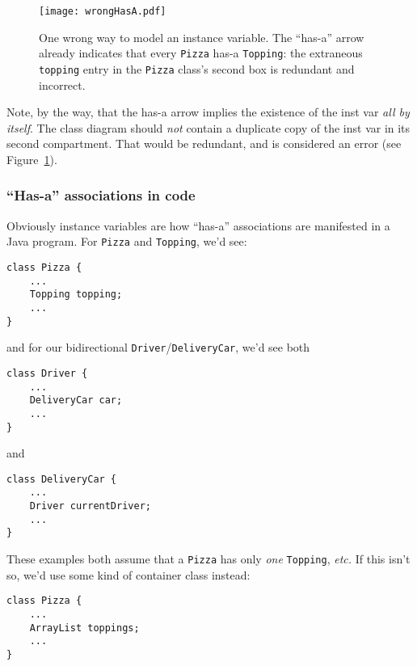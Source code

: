 \begin{figure}[ht]
\centering
\texttt{[image: wrongHasA.pdf]}   %
\caption{One wrong way to model an instance variable. The ``has-a'' arrow
already indicates that every \texttt{Pizza} has-a \texttt{Topping}: the
extraneous \texttt{topping} entry in the \texttt{Pizza} class's second box is
redundant and incorrect.}
\label{fig:wrongHasA}
\end{figure}

Note, by the way, that the has-a arrow implies the existence of the inst var
\textit{all by itself}. The class diagram should \textit{not} contain a
duplicate copy of the inst var in its second compartment. That would be
redundant, and is considered an error (see Figure~\ref{fig:wrongHasA}).

\pagebreak
\subsubsection{``Has-a'' associations in code}

Obviously instance variables are how ``has-a'' associations are manifested in a
Java program. For \texttt{Pizza} and \texttt{Topping}, we'd see:

\begin{Verbatim}[fontsize=\scriptsize,samepage=true,frame=single]
class Pizza {
    ...
    Topping topping;
    ...
}
\end{Verbatim}

and for our bidirectional \texttt{Driver}/\texttt{DeliveryCar}, we'd see both
\begin{Verbatim}[fontsize=\scriptsize,samepage=true,frame=single]
class Driver {
    ...
    DeliveryCar car;
    ...
}
\end{Verbatim}

and

\begin{Verbatim}[fontsize=\scriptsize,samepage=true,frame=single]
class DeliveryCar {
    ...
    Driver currentDriver;
    ...
}
\end{Verbatim}

These examples both assume that a \texttt{Pizza} has only \textit{one}
\texttt{Topping}, \textit{etc.} If this isn't so, we'd use some kind of
container class instead:

\begin{Verbatim}[fontsize=\scriptsize,samepage=true,frame=single]
class Pizza {
    ...
    ArrayList toppings;
    ...
}
\end{Verbatim}

